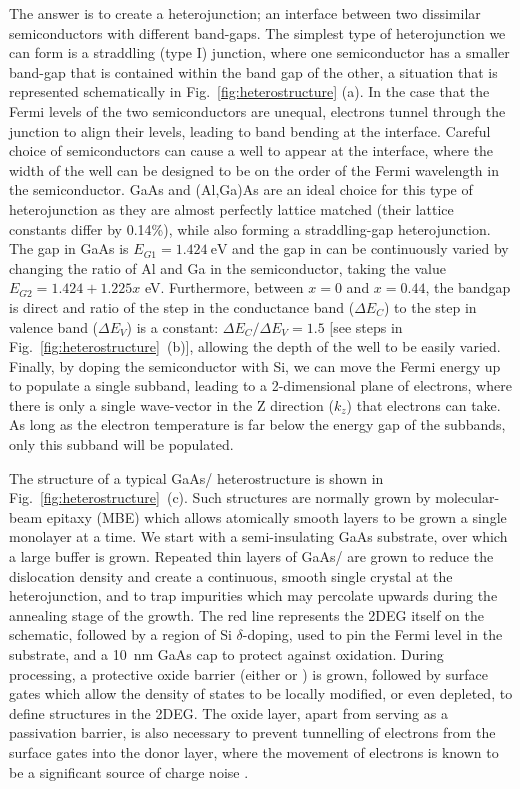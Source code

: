 The answer is to create a heterojunction; an interface between two dissimilar semiconductors with different band-gaps.
The simplest type of heterojunction we can form is a straddling (type I) junction, where one semiconductor has a smaller band-gap
that is contained within the band gap of the other, a situation that is represented schematically in Fig.~\ref{fig:heterostructure} (a).
In the case that the Fermi levels of the two semiconductors are unequal, electrons tunnel through the junction to align
their levels, leading to band bending at the interface. Careful choice of semiconductors can cause a well to appear at the interface,
where the width of the well can be designed to be on the order of the Fermi wavelength in the semiconductor. GaAs and (Al,Ga)As are
an ideal choice for this type of heterojunction as they are almost perfectly lattice matched (their lattice constants differ by 0.14\%),
while also forming a straddling-gap heterojunction. The gap in GaAs is $E_{G1} = \SI{1.424}{\electronvolt}$ and the gap in
 can be continuously varied by
changing the ratio of Al and Ga in the semiconductor, taking the value $E_{G2} = 1.424 + 1.225x$ \si{\electronvolt}.
Furthermore, between $x = 0$ and $x = 0.44$, the bandgap is direct and ratio of the step in the conductance
band ($\Delta E_C$) to the step in valence band ($\Delta E_V$) is a constant: $\Delta E_C/\Delta E_V = 1.5$\cite{adachi1993properties}
[see steps in Fig.~\ref{fig:heterostructure}~(b)], allowing the depth of the well to be easily varied.
Finally, by doping the semiconductor with Si, we can move the Fermi energy up to populate a single subband, leading to a
2-dimensional plane of electrons, where there is only a single wave-vector in the Z direction ($k_z$) that electrons can take. As long
as the electron temperature is far below the energy gap of the subbands, only this subband will be populated.

The structure of a typical GaAs/ heterostructure is shown in Fig.~\ref{fig:heterostructure}~(c). Such structures
are normally grown by molecular-beam epitaxy (MBE) which allows atomically smooth layers to be grown a single monolayer
at a time. We start with a semi-insulating GaAs substrate, over which a large buffer is grown.
Repeated thin layers of GaAs/ are grown to reduce the dislocation density
and create a continuous, smooth single crystal at the heterojunction, and to trap impurities which may percolate upwards
during the annealing stage of the growth. The red line represents the 2DEG itself on the schematic,
followed by a region of Si $\delta$-doping, used to pin the Fermi level in the substrate, and
a \SI{10}{\nano\meter} GaAs cap to protect against oxidation. During processing, a protective oxide barrier
(either  or ) is grown, followed by surface gates which allow the density of states to be locally modified, or even depleted,
to define structures in the 2DEG. The oxide layer, apart from serving as a passivation barrier, is also necessary to
prevent tunnelling of electrons from the surface gates into the donor layer, where the movement of electrons is known to be a significant
source of charge noise \cite{PhysRevB.72.115331, PhysRevApplied.9.034008}.

